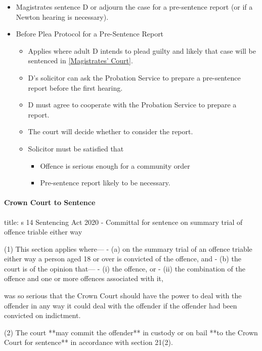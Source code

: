 \documentclass[
]{article}
\newenvironment{Shaded}{}{}
\newcommand{\NormalTok}[1]{#1}
\providecommand{\tightlist}{%
  \setlength{\itemsep}{0pt}\setlength{\parskip}{0pt}}
\begin{document}
\begin{itemize}
\tightlist
\item
  Magistrates sentence D or adjourn the case for a pre-sentence report
  (or if a Newton hearing is necessary).
\item
  Before Plea Protocol for a Pre-Sentence Report

  \begin{itemize}
  \tightlist
  \item
    Applies where adult D intends to plead guilty and likely that case
    will be sentenced in
    \href{maximum\%20compensation\%20of\%20£5,000\%20per\%20offence}{{[}Magistrates'
    Court{]}}.
  \item
    D's solicitor can ask the Probation Service to prepare a
    pre-sentence report before the first hearing.
  \item
    D must agree to cooperate with the Probation Service to prepare a
    report.
  \item
    The court will decide whether to consider the report.
  \item
    Solicitor must be satisfied that

    \begin{itemize}
    \tightlist
    \item
      Offence is serious enough for a community order
    \item
      Pre-sentence report likely to be necessary.
    \end{itemize}
  \end{itemize}
\end{itemize}

\hypertarget{crown-court-to-sentence}{%
\paragraph{Crown Court to Sentence}\label{crown-court-to-sentence}}

\begin{Shaded}
\begin{Highlighting}[]
\NormalTok{title: s 14 Sentencing Act 2020 {-} Committal for sentence on summary trial of offence triable either way}

\NormalTok{(1) This section applies where—}
\NormalTok{{-} (a) on the summary trial of an offence triable either way a person aged 18 or over is convicted of the offence, and}
\NormalTok{{-} (b) the court is of the opinion that—}
\NormalTok{    {-} (i) the offence, or}
\NormalTok{    {-} (ii) the combination of the offence and one or more offences associated with it,}

\NormalTok{was so serious that the Crown Court should have the power to deal with the offender in any way it could deal with the offender if the offender had been convicted on indictment.}

\NormalTok{(2) The court **may commit the offender** in custody or on bail **to the Crown Court for sentence** in accordance with section 21(2).}
\end{Highlighting}
\end{Shaded}
\end{document}
